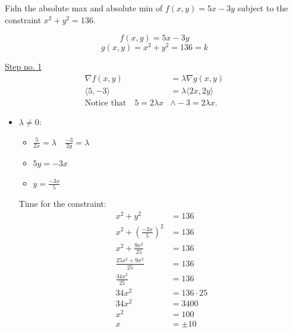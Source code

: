 \documentclass{article}
\begin{document}
\begin{examplebox}
    Fidn the absolute max and absolute min of \( f (x, y) = 5x - 3y \) subject to the constraint \( x^2 + y^2 = 136 \).
    
    \begin{solutionbox}
        \[
            f(x, y) = 5x - 3y
        \]
        \[
            g(x, y) = x^2 + y^2 = 136 = k
        \]

        \underline{Step no. 1}
        \begin{align*}
            \nabla f(x, y) &= \lambda \nabla g(x, y) \\
            \langle 5, -3 \rangle &= \lambda \langle 2x, 2y \rangle \\
            \text{Notice that} \quad 5 = 2\lambda x &\land -3 = 2 \lambda x.
        \end{align*}
        \begin{itemize}
            \item \( \lambda \neq 0 \):
            \begin{itemize}
                \item \( \frac{5}{2x} = \lambda \quad \frac{-3}{2y} = \lambda \)
                \item \( 5y = -3x \) 
                \item \( y = \frac{-3x}{5} \)
            \end{itemize}
            Time for the constraint:
            \begin{align*}
                x^2 + y^2 &= 136 \\
                x^2 + \left( \frac{-3x}{5} \right)^2 &= 136 \\
                x^2 + \frac{9x^2}{25} &= 136 \\
                \frac{25x^2 + 9x^2}{25} &= 136 \\
                \frac{34x^2}{25} &= 136 \\
                34x^2 &= 136 \cdot 25 \\
                34x^2 &= 3400 \\
                x^2 &= 100 \\
                x &= \pm 10
            \end{align*}
        \end{itemize}
    \end{solutionbox}
\end{examplebox}
\end{document}
